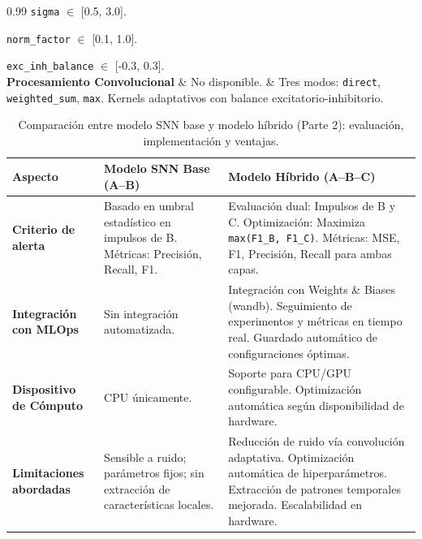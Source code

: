 \begin{table}[!htbp]
\begin{tabularx}{0.99\textwidth}
\texttt{sigma} $\in$ [0.5, 3.0].  

\texttt{norm\_factor} $\in$ [0.1, 1.0].  

\texttt{exc\_inh\_balance} $\in$ [-0.3, 0.3]. \\
\hline
\textbf{Procesamiento Convolucional} & 
No disponible. & 
Tres modos: \texttt{direct}, \texttt{weighted\_sum}, \texttt{max}.  
Kernels adaptativos con balance excitatorio-inhibitorio. \\
\hline\hline
\end{tabularx}
\caption{Comparación entre modelo SNN base y modelo híbrido (Parte 1): arquitectura, conexiones y optimización.}
\label{tab:comparacion-arquitecturas-1}
\end{table}

\begin{table}[!htbp]
\centering
\small
\renewcommand{\arraystretch}{1.3}
\begin{tabularx}{0.99\textwidth}{>{\hsize=0.5\hsize\raggedright\arraybackslash}X
                                 >{\hsize=1.2\hsize\raggedright\arraybackslash}X
                                 >{\hsize=1.3\hsize\raggedright\arraybackslash}X}
\hline\hline
\textbf{Aspecto} & \textbf{Modelo SNN Base (A--B)} & \textbf{Modelo Híbrido (A--B--C)} \\
\hline
\textbf{Criterio de alerta} & 
Basado en umbral estadístico en impulsos de B.  
Métricas: Precisión, Recall, F1. & 
Evaluación dual: Impulsos de B y C.  
Optimización: Maximiza \texttt{max(F1\_B, F1\_C)}.  
Métricas: MSE, F1, Precisión, Recall para ambas capas. \\
\hline
\textbf{Integración con MLOps} & 
Sin integración automatizada. & 
Integración con Weights \& Biases (wandb).  
Seguimiento de experimentos y métricas en tiempo real.  
Guardado automático de configuraciones óptimas. \\
\hline
\textbf{Dispositivo de Cómputo} & 
CPU únicamente. & 
Soporte para CPU/GPU configurable.  
Optimización automática según disponibilidad de hardware. \\
\hline
\textbf{Limitaciones abordadas} & 
Sensible a ruido; parámetros fijos; sin extracción de características locales. & 
Reducción de ruido vía convolución adaptativa.  
Optimización automática de hiperparámetros.  
Extracción de patrones temporales mejorada.  
Escalabilidad en hardware. \\
\hline\hline
\end{tabularx}
\caption{Comparación entre modelo SNN base y modelo híbrido (Parte 2): evaluación, implementación y ventajas.}
\label{tab:comparacion-arquitecturas-2}
\end{table}


